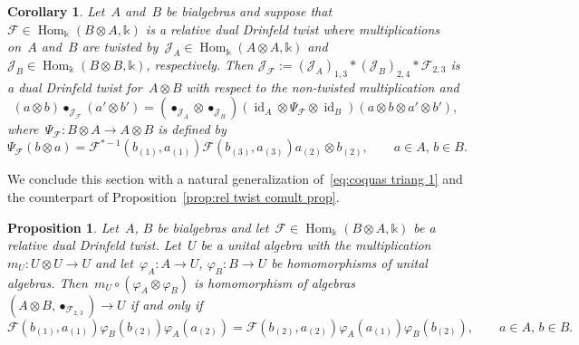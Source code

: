\documentclass[12pt, reqno]{amsart}
\newtheorem{corollary}[theorem]{Corollary}
\newtheorem{proposition}[theorem]{Proposition}
\theoremstyle{definition}
\numberwithin{equation}{section}
\newcommand{\tensor}{\otimes}
\newcommand{\kk}{\mathbb{k}}\newcommand{\lie}[1]{{\mathfrak{#1}}}
\DeclareMathOperator{\id}{id}
\DeclareMathOperator{\Hom}{Hom}
\begin{document}
\begin{corollary}\label{cor:dual twist from rel twist}
Let~$A$ and~$B$ be bialgebras and suppose
that~$\mathcal F\in\Hom_\kk(B\tensor A,\kk)$ is a relative dual Drinfeld twist where multiplications 
on~$A$ and~$B$ are twisted by~$\mathcal J_A\in\Hom_\kk(A\tensor A,\kk)$ and~$\mathcal J_B\in 
\Hom_\kk(B\tensor B,\kk)$, respectively. 
Then $\mathcal J_{\mathcal F}:=(\mathcal J_A)_{1,3}\ast (\mathcal J_B)_{2,4}\ast \mathcal F_{2,3}$ is a dual Drinfeld twist for~$A\tensor B$ 
with respect to the non-twisted multiplication and
$$
(a\tensor b)\bullet_{\mathcal J_{\mathcal F}}(a'\tensor b')=(\bullet_{\mathcal J_A}\tensor\bullet_{\mathcal J_B})
(\id_A\tensor \Psi_{\mathcal F}\tensor \id_B)(a\tensor b\tensor a'\tensor b'),
$$
where~$\Psi_{\mathcal F}:B\tensor A\to A\tensor B$ is defined by
$$
\Psi_{\mathcal F}(b\tensor a)=\mathcal F^{\ast-1}(b_{(1)},a_{(1)})\mathcal F(b_{(3)},a_{(3)})a_{(2)}\tensor b_{(2)},\qquad a\in A,\,b\in B.
$$
\end{corollary}
We conclude this section with a natural generalization of~\eqref{eq:coquas triang 1} and the counterpart of Proposition~\ref{prop:rel twist comult prop}.
\begin{proposition}\label{prop:twist hom alg}
Let~$A$, $B$ be bialgebras and let~$\mathcal F\in\Hom_\kk(B\tensor A,\kk)$ be a relative dual Drinfeld twist. Let~$U$ be a unital algebra with
the multiplication~$m_U:U\tensor U\to U$ and 
let~$\varphi_A:A\to U$, $\varphi_B:B\to U$ be homomorphisms of unital algebras.
Then~$m_U\circ(\varphi_A\tensor\varphi_B)$ is 
homomorphism of algebras
$(A\tensor B,\bullet_{\mathcal F_{2,3}})\to U$ if and only if
\begin{equation}
\mathcal F(b_{(1)},a_{(1)})\varphi_B(b_{(2)})\varphi_A(a_{(2)})=
\mathcal F(b_{(2)},a_{(2)})\varphi_A(a_{(1)})\varphi_B(b_{(2)}),
\qquad a\in A,\,b\in B.\label{eq:cnd hom F}
\end{equation}
\end{proposition}
\end{document}
